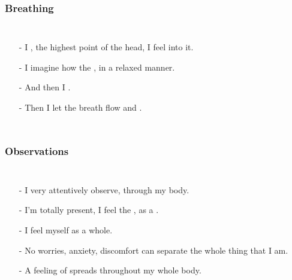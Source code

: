 \begin{frame}
\frametitle{Breathing}
\begin{columns}[c] %

\begin{itemize}
\item[-] I , the highest point of the head, I feel into it.
\item[-] I imagine how the , in a relaxed manner.
\item[-] And then I .
\item[-] Then I let the breath flow  and .
\end{itemize}
\end{columns}
\end{frame}

\begin{frame}
\frametitle{Observations}
\begin{columns}[c] %

\begin{itemize}
\item[-] I very attentively observe,  through my body.
\item[-] I'm totally present, I feel the , as a .
\item[-] I feel myself as a whole.
\item[-] No worries, anxiety, discomfort can separate the whole thing that I am.
  \item[-] A feeling of  spreads throughout my whole body.

  \end{itemize}
\end{columns}
\end{frame}

